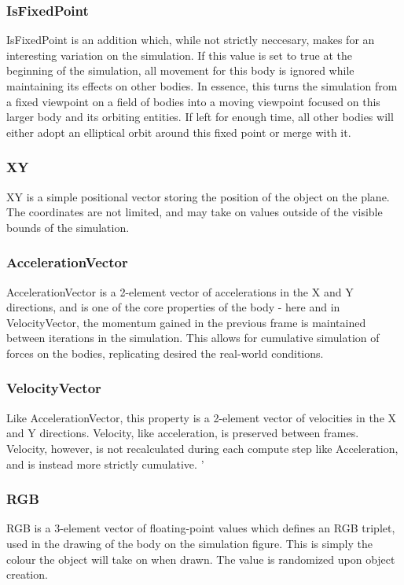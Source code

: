 \documentclass[11pt]{article}
\begin{document}
\subsubsection{IsFixedPoint}
IsFixedPoint is an addition which, while not strictly neccesary, makes for an interesting variation on the simulation. If this value is set to true at the beginning of the simulation, all movement for this body is ignored while maintaining its effects on other bodies. In essence, this turns the simulation from a fixed viewpoint on a field of bodies into a moving viewpoint focused on this larger body and its orbiting entities. If left for enough time, all other bodies will either adopt an elliptical orbit around this fixed point or merge with it.

\subsubsection{XY}
XY is a simple positional vector storing the position of the object on the plane. The coordinates are not limited, and may take on values outside of the visible bounds of the simulation.

\subsubsection{AccelerationVector}
AccelerationVector is a 2-element vector of accelerations in the X and Y directions, and is one of the core properties of the body - here and in VelocityVector, the momentum gained in the previous frame is maintained between iterations in the simulation. This allows for cumulative simulation of forces on the bodies, replicating desired the real-world conditions. 

\subsubsection{VelocityVector}
Like AccelerationVector, this property is a 2-element vector of velocities in the X and Y directions. Velocity, like acceleration, is preserved between frames. Velocity, however, is not recalculated during each compute step like Acceleration, and is instead more strictly cumulative.
'
\subsubsection{RGB}
RGB is a 3-element vector of floating-point values which defines an RGB triplet, used in the drawing of the body on the simulation figure. This is simply the colour the object will take on when drawn. The value is randomized upon object creation.
\end{document}

